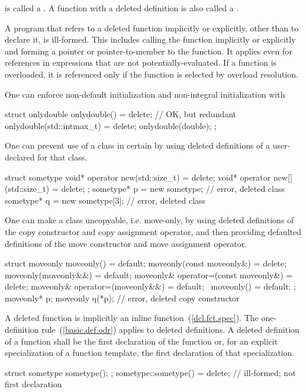 is called a . A function with a
deleted definition is also called a .

\pnum
A program that refers to a deleted function implicitly or explicitly, other
than to declare it, is ill-formed. \enternote This includes calling the function
implicitly or explicitly and forming a pointer or pointer-to-member to the
function. It applies even for references in expressions that are not
potentially-evaluated. If a function is overloaded, it is referenced only if the
function is selected by overload resolution. \exitnote

\pnum
\enterexample One can enforce non-default initialization and non-integral
initialization with

\begin{codeblock}
struct onlydouble {
  onlydouble() = delete;              // OK, but redundant
  onlydouble(std::intmax_t) = delete;
  onlydouble(double);
};
\end{codeblock}

\exitexample

\enterexample One can prevent use of a
class in certain  by using deleted definitions
of a user-declared  for that class.

\begin{codeblock}
struct sometype {
  void* operator new(std::size_t) = delete;
  void* operator new[](std::size_t) = delete;
};
sometype* p = new sometype;     // error, deleted class 
sometype* q = new sometype[3];  // error, deleted class 
\end{codeblock}
\exitexample

\enterexample One can make a class uncopyable, i.e. move-only, by using deleted
definitions of the copy constructor and copy assignment operator, and then
providing defaulted definitions of the move constructor and move assignment operator.

\begin{codeblock}
struct moveonly {
  moveonly() = default;
  moveonly(const moveonly&) = delete;
  moveonly(moveonly&&) = default;
  moveonly& operator=(const moveonly&) = delete;
  moveonly& operator=(moveonly&&) = default;
  ~moveonly() = default;
};
moveonly* p;
moveonly q(*p); // error, deleted copy constructor
\end{codeblock}
\exitexample

\pnum
A deleted function is implicitly an inline function~(\ref{dcl.fct.spec}). \enternote The
one-definition rule~(\ref{basic.def.odr}) applies to deleted definitions. \exitnote
A deleted definition of a function shall be the first declaration of the function or,
for an explicit specialization of a function template, the first declaration of that
specialization.
\enterexample
\begin{codeblock}
struct sometype {
  sometype();
};
sometype::sometype() = delete;      // ill-formed; not first declaration
\end{codeblock}
\exitexample%

